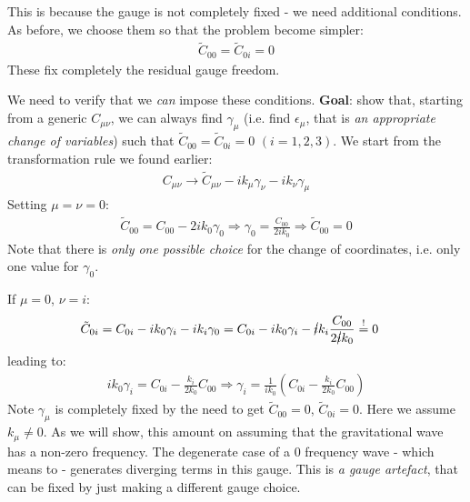 \documentclass[../template.tex]{subfiles}
\begin{document}
This is because the gauge is not completely fixed - we need additional conditions. As before, we choose them so that the problem become simpler:
\begin{align*}
    \tilde{C}_{00} = \tilde{C}_{0i} = 0
\end{align*}
These fix completely the residual gauge freedom.

\medskip

We need to verify that we \textit{can} impose these conditions. 
\textbf{Goal}: show that, starting from a generic $C_{\mu \nu}$, we can always find $\gamma_\mu$ (i.e. find $\epsilon_\mu$, that is \textit{an appropriate change of variables}) such that $\tilde{C}_{00} = \tilde{C}_{0i} = 0$ $(i=1,2,3)$.
We start from the transformation rule we found earlier:
\begin{align*}
    C_{\mu \nu} \to \tilde{C}_{\mu \nu} - ik_\mu \gamma_\nu - ik_\nu \gamma_\mu
\end{align*}
Setting $\mu = \nu = 0$:
\begin{align*}
    \tilde{C}_{00} = C_{00} - 2i k_0 \gamma_0 \Rightarrow \gamma_0 = \frac{C_{00} }{2 i k_0} \Rightarrow \tilde{C}_{00} = 0 
\end{align*}
Note that there is \textit{only one possible choice} for the change of coordinates, i.e. only one value for $\gamma_0$.

If $\mu = 0$, $\nu=i$:
\begin{align*}
    \tilde{C}_{0i} &= C_{0i} - i k_0 \gamma_i - ik_i \gamma_0 = C_{0i} - ik_0 \gamma_i - \cancel{i} k_i \frac{C_{00}}{2\cancel{i} k_0} \overset{!}{=}  0
\end{align*}
leading to:
\begin{align*}
    i k_0 \gamma_i = C_{0i} - \frac{k_i}{2 k_0} C_{00} \Rightarrow \gamma_i = \frac{1}{i k_0} \left(C_{0i} - \frac{k_i}{2 k_0} C_{00}  \right)  
\end{align*}
Note $\gamma_\mu$ is completely fixed by the need to get $\tilde{C}_{00} = 0$, $\tilde{C}_{0i} = 0$.
Here we assume $k_\mu \neq 0$. As we will show, this amount on assuming that the gravitational wave has a non-zero frequency. The degenerate case of a $0$ frequency wave - which means to  - generates diverging terms in this gauge. This is \textit{a gauge artefact}, that can be fixed by just making a different gauge choice. 

\medskip
\end{document}
